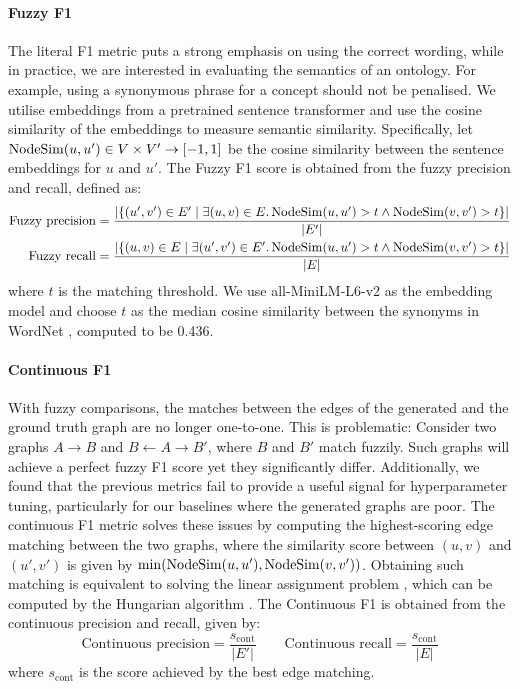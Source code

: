 \paragraph{Fuzzy F1}
The literal F1 metric puts a strong emphasis on using the correct wording, while in practice, we are interested in evaluating the semantics of an ontology. For example, using a synonymous phrase for a concept should not be penalised. We utilise embeddings from a pretrained sentence transformer and use the cosine similarity of the embeddings to measure semantic similarity. Specifically, let $\operatorname{NodeSim}(u, u') \in V \times V' \to [-1, 1]$ be the cosine similarity between the sentence embeddings for $u$ and $u'$. The Fuzzy F1 score is obtained from the fuzzy precision and recall, defined as:
\begin{equation*}
    \begin{aligned}
        \text{Fuzzy precision} & = \frac{|
            \{(u', v') \in E' \mid \exists (u, v) \in E.
            \operatorname{NodeSim}(u, u') > t \land \operatorname{NodeSim}(v, v') > t
            \}
        |}{|E'|}                           \\
        \text{Fuzzy recall}    & = \frac{|
            \{(u, v) \in E \mid \exists (u', v') \in E'.
            \operatorname{NodeSim}(u, u') > t \land \operatorname{NodeSim}(v, v') > t
            \}
        |}{|E|}                            \\
    \end{aligned}
\end{equation*}
where $t$ is the matching threshold. We use all-MiniLM-L6-v2 \cite{wang2020minilm,reimers-2019-sentence-bert} as the embedding model and choose $t$ as the median cosine similarity between the synonyms in WordNet \cite{miller1995wordnet}, computed to be 0.436.

\paragraph{Continuous F1}
With fuzzy comparisons, the matches between the edges of the generated and the ground truth graph are no longer one-to-one. This is problematic: Consider two graphs $A \rightarrow B$ and $B \leftarrow A \rightarrow B'$, where $B$ and $B'$ match fuzzily. Such graphs will achieve a perfect fuzzy F1 score yet they significantly differ. Additionally, we found that the previous metrics fail to provide a useful signal for hyperparameter tuning, particularly for our baselines where the generated graphs are poor. The continuous F1 metric solves these issues by computing the highest-scoring edge matching between the two graphs, where the similarity score between $(u, v)$ and $(u', v')$ is given by $\min(\operatorname{NodeSim}(u, u'), \operatorname{NodeSim}(v, v'))$. Obtaining such matching is equivalent to solving the linear assignment problem \cite{martello1987linear}, which can be computed by the Hungarian algorithm \cite{kuhn1955hungarian}. The Continuous F1 is obtained from the continuous precision and recall, given by:
\[
    \text{Continuous precision} = \frac{s_\text{cont}}{|E'|} \qquad
    \text{Continuous recall} = \frac{s_\text{cont}}{|E|}
\]
where $s_\text{cont}$ is the score achieved by the best edge matching.

